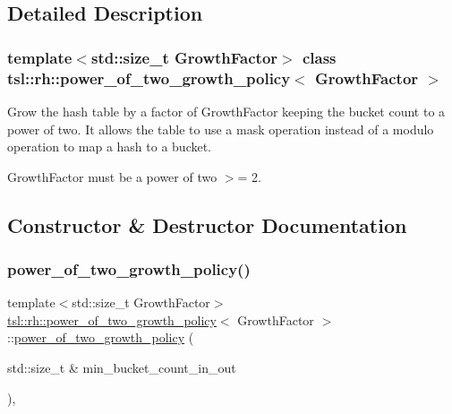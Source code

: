 \subsection{Detailed Description}
\subsubsection*{template$<$std\+::size\+\_\+t Growth\+Factor$>$\newline
class tsl\+::rh\+::power\+\_\+of\+\_\+two\+\_\+growth\+\_\+policy$<$ Growth\+Factor $>$}

Grow the hash table by a factor of Growth\+Factor keeping the bucket count to a power of two. It allows the table to use a mask operation instead of a modulo operation to map a hash to a bucket.

Growth\+Factor must be a power of two $>$= 2. 

\subsection{Constructor \& Destructor Documentation}
\mbox{\label{classtsl_1_1rh_1_1power__of__two__growth__policy_a8b66b984743a4ba03c6b5862920b38b8}} 
\subsubsection{\texorpdfstring{power\_of\_two\_growth\_policy()}{power\_of\_two\_growth\_policy()}}
{\footnotesize\ttfamily template$<$std\+::size\+\_\+t Growth\+Factor$>$ \\
\mbox{\hyperlink{classtsl_1_1rh_1_1power__of__two__growth__policy}{tsl\+::rh\+::power\+\_\+of\+\_\+two\+\_\+growth\+\_\+policy}}$<$ Growth\+Factor $>$\+::\mbox{\hyperlink{classtsl_1_1rh_1_1power__of__two__growth__policy}{power\+\_\+of\+\_\+two\+\_\+growth\+\_\+policy}} (\begin{DoxyParamCaption}\item[{std\+::size\+\_\+t \&}]{min\+\_\+bucket\+\_\+count\+\_\+in\+\_\+out }\end{DoxyParamCaption})\hspace{0.3cm}{\ttfamily [inline]}, {\ttfamily [explicit]}}

